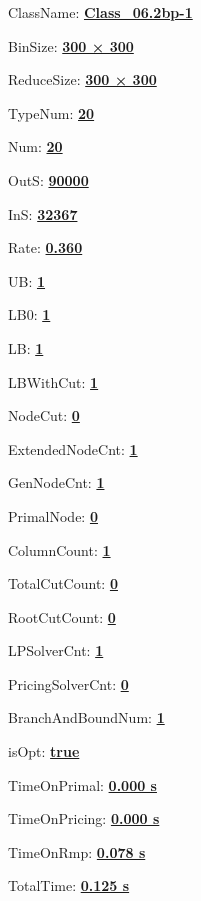 \documentclass[11pt]{article}
\begin{document}
\pagestyle{empty}


ClassName: \underline{\textbf{Class_06.2bp-1}}
\par
BinSize: \underline{\textbf{300 × 300}}
\par
ReduceSize: \underline{\textbf{300 × 300}}
\par
TypeNum: \underline{\textbf{20}}
\par
Num: \underline{\textbf{20}}
\par
OutS: \underline{\textbf{90000}}
\par
InS: \underline{\textbf{32367}}
\par
Rate: \underline{\textbf{0.360}}
\par
UB: \underline{\textbf{1}}
\par
LB0: \underline{\textbf{1}}
\par
LB: \underline{\textbf{1}}
\par
LBWithCut: \underline{\textbf{1}}
\par
NodeCut: \underline{\textbf{0}}
\par
ExtendedNodeCnt: \underline{\textbf{1}}
\par
GenNodeCnt: \underline{\textbf{1}}
\par
PrimalNode: \underline{\textbf{0}}
\par
ColumnCount: \underline{\textbf{1}}
\par
TotalCutCount: \underline{\textbf{0}}
\par
RootCutCount: \underline{\textbf{0}}
\par
LPSolverCnt: \underline{\textbf{1}}
\par
PricingSolverCnt: \underline{\textbf{0}}
\par
BranchAndBoundNum: \underline{\textbf{1}}
\par
isOpt: \underline{\textbf{true}}
\par
TimeOnPrimal: \underline{\textbf{0.000 s}}
\par
TimeOnPricing: \underline{\textbf{0.000 s}}
\par
TimeOnRmp: \underline{\textbf{0.078 s}}
\par
TotalTime: \underline{\textbf{0.125 s}}
\par
\newpage
\end{document}
